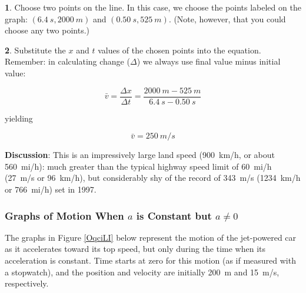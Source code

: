 \documentclass[../../main-ap-physics.tex]{subfiles}
\begin{document}
\textbf{1}. Choose two points on the line. In this case, we choose the points labeled on the graph: $\left(\SI{6.4}{s}, \SI{2000}{m}\right)$ and $\left(\SI{0.50}{s}, \SI{525}{m}\right)$. (Note, however, that you could choose any two points.)

\vspace{1em}

\textbf{2}. Substitute the $x$ and $t$ values of the chosen points into the equation. Remember: in calculating change ($\Delta$) we always use final value minus initial value:

\begin{equation*}
    \bar{v} = \frac{\Delta x}{\Delta t} = \frac{\SI{2000}{m} - 
    \SI{525}{m}}{\SI{6.4}{s} - \SI{0.50}{s}}
\end{equation*}

yielding

\begin{equation*}
    \bar{v} = \SI{250}{m/s}
\end{equation*}

\textbf{Discussion}: This is an impressively large land speed (\SI{900}{km/h}, or about \SI{560}{mi/h}): much greater than the typical highway speed limit of \SI{60}{mi/h} (\SI{27}{m/s} or \SI{96}{km/h}), but considerably shy of the record of \SI{343}{m/s} (\SI{1234}{km/h} or \SI{766}{mi/h}) set in 1997.

\endsolution

\subsubsection*{Graphs of Motion When $a$ is Constant but $a \neq 0$}

The graphs in Figure \ref{OqciLI} below represent the motion of the jet-powered car as it accelerates toward its top speed, but only during the time when its acceleration is constant. Time starts at zero for this motion (as if measured with a stopwatch), and the position and velocity are initially \SI{200}{m} and \SI{15}{m/s}, respectively.
\end{document}
